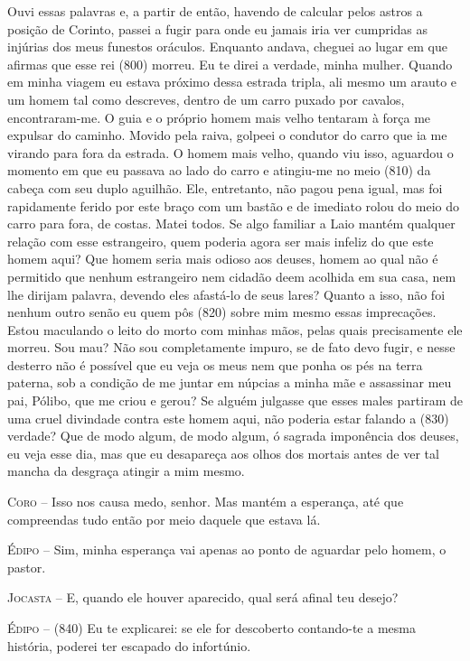 Ouvi essas palavras e, a partir de então, havendo de calcular pelos
astros a posição de Corinto, passei a fugir para onde eu jamais iria ver
cumpridas as injúrias dos meus funestos oráculos. Enquanto andava,
cheguei ao lugar em que afirmas que esse rei (800) morreu. Eu te direi a
verdade, minha mulher. Quando em minha viagem eu estava próximo dessa
estrada tripla, ali mesmo um arauto e um homem tal como descreves,
dentro de um carro puxado por cavalos, encontraram-me. O guia e o
próprio homem mais velho tentaram à força me expulsar do caminho. Movido
pela raiva, golpeei o condutor do carro que ia me virando para fora da
estrada. O homem mais velho, quando viu isso, aguardou o momento em que
eu passava ao lado do carro e atingiu-me no meio (810) da cabeça com seu
duplo aguilhão. Ele, entretanto, não pagou pena igual, mas foi
rapidamente ferido por este braço com um bastão e de imediato rolou do
meio do carro para fora, de costas. Matei todos. Se algo familiar a Laio
mantém qualquer relação com esse estrangeiro, quem poderia agora ser
mais infeliz do que este homem aqui? Que homem seria mais odioso aos
deuses, homem ao qual não é permitido que nenhum estrangeiro nem cidadão
deem acolhida em sua casa, nem lhe dirijam palavra, devendo eles
afastá-lo de seus lares? Quanto a isso, não foi nenhum outro senão eu
quem pôs (820) sobre mim mesmo essas imprecações. Estou maculando o
leito do morto com minhas mãos, pelas quais precisamente ele morreu. Sou
mau? Não sou completamente impuro, se de fato devo fugir, e nesse
desterro não é possível que eu veja os meus nem que ponha os pés na
terra paterna, sob a condição de me juntar em núpcias a minha mãe e
assassinar meu pai, Pólibo, que me criou e gerou? Se alguém julgasse que
esses males partiram de uma cruel divindade contra este homem aqui, não
poderia estar falando a (830) verdade? Que de modo algum, de modo algum,
ó sagrada imponência dos deuses, eu veja esse dia, mas que eu desapareça
aos olhos dos mortais antes de ver tal mancha da desgraça atingir a mim
mesmo.

\textsc{Coro} --   Isso nos causa medo, senhor. Mas mantém a esperança, até que compreendas
tudo então por meio daquele que estava lá.

\textsc{Édipo} --   Sim, minha esperança vai apenas ao ponto de aguardar pelo homem, o
pastor.

\textsc{Jocasta} --   E, quando ele houver aparecido, qual será afinal teu desejo?

\textsc{Édipo} --   (840) Eu te explicarei: se ele for descoberto contando-te a mesma
história, poderei ter escapado do infortúnio.

